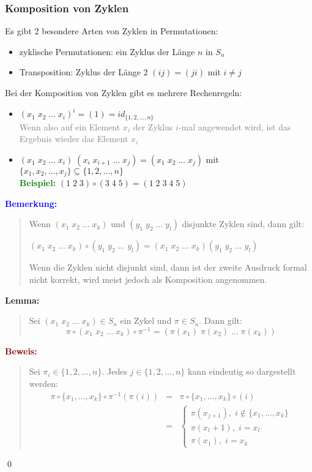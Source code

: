 \documentclass{article}
\newcommand{\gray}[1]{\textcolor{gray}{#1}}
\newcommand{\blue}[1]{\textcolor{blue}{#1}}
\newcommand{\green}[1]{\textcolor{green}{#1}}
\newcommand{\dgr}[1]{\textcolor{dgr}{#1}}
\newcommand{\maroon}[1]{\textcolor{maroon}{#1}}
\newcommand{\ex}{\green{\textbf{Beispiel: }}}
\newcommand{\an}[1]{\blue{\textbf{Bemerkung: }}\begin{quote}#1\end{quote}}
\newcommand{\lem}[1]{\dgr{\textbf{Lemma: }}\begin{quote}#1\end{quote}}
\newcommand{\pr}[1]{\maroon{\textbf{Beweis: }}\begin{quote}#1\end{quote}\qed}
\begin{document}
\subsubsection{Komposition von Zyklen}
Es gibt 2 besondere Arten von Zyklen in Permutationen:
\begin{itemize}
    \item zyklische Permutationen: ein Zyklus der Länge $n$ in $S_n$
    \item Transposition: Zyklus der Länge $2$ $(ij) = (ji)$ mit $i \neq j$
\end{itemize}

Bei der Komposition von Zyklen gibt es mehrere Rechenregeln:
\begin{itemize}
    \item $(x_1 \; x_2 \; \dots \; x_i)^i = (1) = id_{\{1, 2, \dots, n\}}$\\
    \gray{Wenn also auf ein Element $x_i$ der Zyklus $i$-mal angewendet wird, ist das Ergebnis wieder das Element $x_i$}
    \item $(x_1 \; x_2 \; \dots \; x_i) \; (x_i \; x_{i+1} \; \dots \; x_{j}) = (x_1 \; x_2 \; \dots \; x_j)$ mit $\{x_1, x_2, \dots, x_j\} \subseteq \{1, 2, \dots, n\}$\\
    \ex $(1 \; 2 \; 3) \circ (3 \; 4 \; 5) = (1 \; 2 \; 3 \; 4 \; 5)$
\end{itemize}

\an{
    Wenn $(x_1 \; x_2 \; \dots \; x_k)$ und $(y_1 \; y_2 \; \dots \; y_l)$ disjunkte Zyklen sind, dann gilt:
    \begin{center}
        $(x_1 \; x_2 \; \dots \; x_k) \circ (y_1 \; y_2 \; \dots \; y_l) = (x_1 \; x_2 \; \dots \; x_k)(y_1 \; y_2 \; \dots \; y_l)$
    \end{center}
    Wenn die Zyklen nicht disjunkt sind, dann ist der zweite Ausdruck formal nicht korrekt, wird meist jedoch als Komposition angenommen.
}

\lem{
    Sei $(x_1 \; x_2 \; \dots \; x_k) \in S_n$ ein Zykel und $\pi \in S_n$. Dann gilt:
    \begin{equation*}
        \pi \circ (x_1 \; x_2 \; \dots \; x_k) \circ \pi^{-1} = (\pi(x_1) \; \pi(x_2) \; \dots \; \pi(x_k))
    \end{equation*}
}

\pr{
    Sei $\pi_i \in \{1, 2, \dots, n\}$. Jedes $j \in \{1, 2, \dots, n\}$ kann eindeutig so dargestellt werden:
    \begin{equation*}
        \begin{array}{lcl}
            \pi \circ \{x_1, ..., x_k\} \circ \pi^{-1}(\pi(i)) & = & \pi \circ \{x_1, ..., x_k\} \circ (i)\\
            & = &
            \begin{cases}
                \pi(x_{j+1}), \; i \notin \{x_1, ..., x_k\}\\
                \pi(x_l + 1), \; i = x_l\\
                \pi(x_1), \; i = x_k
            \end{cases}
        \end{array}
    \end{equation*}
}
\end{document}

